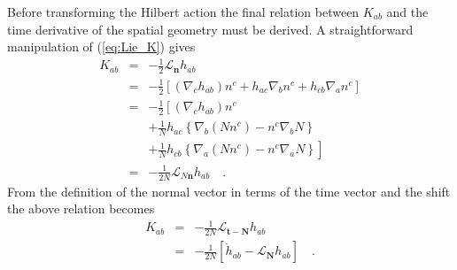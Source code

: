 \documentclass[twocolumn]{article}
\def\.{{\quad .}}
\begin{document}
Before transforming the Hilbert action the final relation between $K_{ab}$ and
the time derivative of the spatial geometry must be derived.  A straightforward
manipulation of (\ref{eq:Lie_K}) gives
\begin{eqnarray}\label{eq:Lie_K_2}
   K_{ab} & = & -\frac{1}{2} {\mathcal L}_{\mathbf{n}} h_{ab} \nonumber \\
          & = & -\frac{1}{2} \left[
                                \left(\nabla_c h_{ab}\right)n^c
                                + h_{ac} \nabla_b n^c + h_{cb} \nabla_a n^c
                               \right] \nonumber \\
          & = & -\frac{1}{2} \left[
                                \left(
                                  \nabla_c h_{ab}
                                \right)n^c \right. \nonumber \\
          &   &                   \left. + \frac{1}{N}h_{ac}
                                  \left\{ \nabla_b \left(N n^c \right)
                                          - n^c \nabla_b N \right\} \right. \nonumber \\
          &   &                   \left. + \frac{1}{N}h_{cb}
                                  \left\{ \nabla_a \left(N n^c \right)
                                          - n^c \nabla_a N \right\}
                             \right] \nonumber \\
          & = & -\frac{1}{2N} {\mathcal L}_{N\mathbf{n}} h_{ab} \.
\end{eqnarray}
From the definition of the normal vector in terms of the time vector and the shift
the above relation becomes
\begin{eqnarray}
K_{ab}    & = & -\frac{1}{2 N} {\mathcal L}_{\mathbf{t} - \mathbf{N}} h_{ab} \nonumber \\
          & = & -\frac{1}{2 N} \left[ {\dot h}_{ab}
               - {\mathcal L}_{\mathbf{N}} h_{ab} \right] \.
\end{eqnarray}
\end{document}
